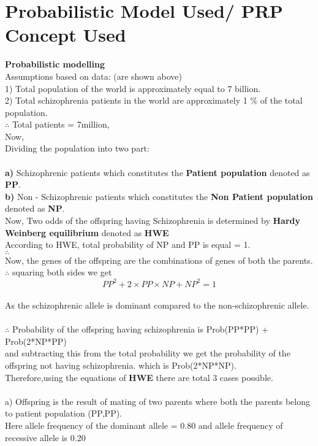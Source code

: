 \documentclass{article}
\begin{document}
\section{Probabilistic Model Used/ PRP Concept Used}
\textbf{Probabilistic modelling}\\
Assumptions based on data: (are shown above)
\\
1) Total population of the world is approximately equal to 7 billion.
\\
2) Total schizophrenia patients in the world are approximately 1 \% of the total population.
\\
$\therefore$ Total patients = 7million,
\\
Now,
\\
Dividing the population into two part:\\ \\ 
\textbf{a)} Schizophrenic patients which constitutes the \textbf{Patient population} denoted as \textbf{PP}.
\\
\textbf{b)} Non - Schizophrenic patients which constitutes the \textbf{Non Patient population} denoted as \textbf{NP}.
\\
Now, Two odds of the offspring having Schizophrenia is determined by \textbf{Hardy Weinberg equilibrium} denoted as \textbf{HWE}\\
According to HWE, total probability of NP and PP is equal = 1.
\\
$\therefore$ 
\\
Now, the genes of the offspring are the combinations of genes of both the parents.
\\
$\therefore$ squaring both sides we get
\begin{equation*}
    \boxed{PP^2 + 2\times PP\times NP + NP^2 = 1}
\end{equation*}
\\
As the schizophrenic allele is dominant compared to the non-schizophrenic allele. \\ \\$\therefore$ Probability of the offspring having schizophrenia is Prob(PP*PP) + Prob(2*NP*PP)
\\
and subtracting this from the total probability we get the probability of the offspring not having schizophrenia. which is Prob(2*NP*NP).
\\
Therefore,using the equations of \textbf{HWE} there are total 3 cases possible.
\\
\\
a) Offspring is the result of mating of two parents where both the parents belong to patient population (PP,PP). \\Here allele frequency of the dominant allele = 0.80 and allele frequency of recessive allele is 0.20
\end{document}
